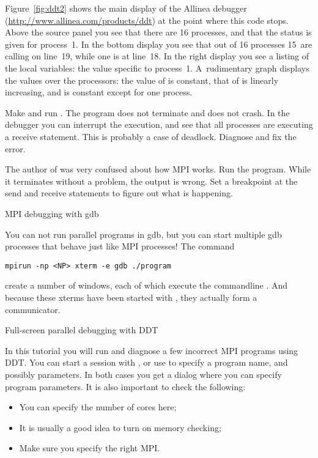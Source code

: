 Figure~\ref{fig:ddt2} shows the main display of the Allinea 
debugger (\url{http://www.allinea.com/products/ddt}) at the point where this code stops.
Above the source panel you see that there are 16 processes, and that the status is given
for process~1.
In the bottom display you see that out of 16 processes 15~are calling  on line~19,
while one is at line~18. In the right display you see a listing of the local variables:
the value specific to process~1. A~rudimentary graph displays the values over the processors:
the value of  is constant, that of  is linearly increasing, and 
is constant except for one process.

\begin{exercise}
  Make and run . The program does not terminate and does not crash.
  In the debugger you can interrupt the execution, and see that all processes
  are executing a receive statement. This is probably a case of deadlock.
  Diagnose and fix the error.
\end{exercise}

\begin{exercise}
  The author of  was very confused about how MPI works. Run the program.
  While it terminates without a problem, the output is wrong. Set a breakpoint
  at the send and receive statements to figure out what is happening.
\end{exercise}


 {MPI debugging with gdb}

You can not run parallel programs in gdb, but you can start multiple
gdb processes that behave just like MPI processes! The command
\begin{verbatim}
mpirun -np <NP> xterm -e gdb ./program 
\end{verbatim}
create a number of  windows, each of which execute
the commandline . And because these xterms have
been started with , they actually form a communicator.


 {Full-screen parallel debugging with DDT}

In this tutorial you will run and diagnose a few incorrect MPI
programs using DDT.  You can start a session with , or use  to specify a program name,
and possibly parameters.  In both cases you get a dialog where you
can specify program parameters. It is also important to check the following:
\begin{itemize}
\item You can specify the number of cores here;
\item It is usually a good idea to turn on memory checking;
\item Make sure you specify the right MPI.
\end{itemize}

